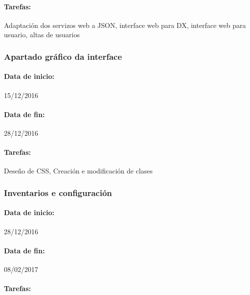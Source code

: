 \paragraph{Tarefas:} Adaptación dos servizos web a JSON, interface web 	para DX,
interface web para usuario, altas de usuarios

\subsubsection{Apartado gráfico da interface}
\paragraph{Data de inicio:} 15/12/2016
\paragraph{Data de fin:} 28/12/2016
\paragraph{Tarefas:} Deseño de CSS, Creación e modificación de clases

\subsubsection{Inventarios e configuración}
\paragraph{Data de inicio:} 28/12/2016
\paragraph{Data de fin:} 08/02/2017
\paragraph{Tarefas:} 
